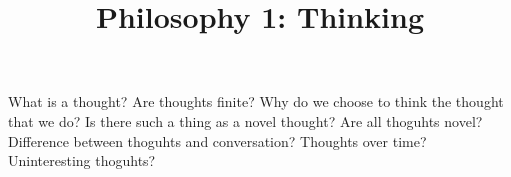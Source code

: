 \documentclass[11pt]{ekblite}
\begin{document}
\title{Philosophy 1: Thinking}
\maketitle

What is a thought?
Are thoughts finite?
Why do we choose to think the thought that we do?
Is there such a thing as a novel thought? 
Are all thoguhts novel? 
Difference between thoguhts and conversation?
Thoughts over time?
Uninteresting thoguhts?
\end{document}
